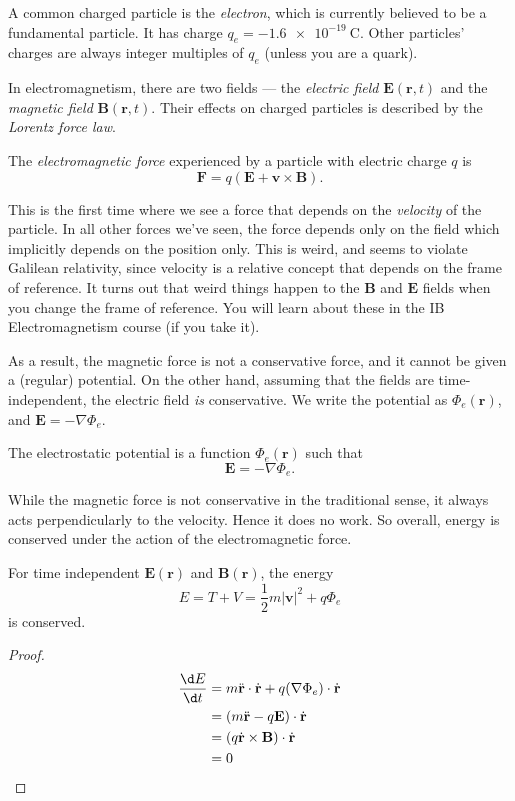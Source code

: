 \documentclass[a4paper]{article}
\begin{document}
A common charged particle is the \emph{electron}, which is currently believed to be a fundamental particle. It has charge $q_e = \SI{-1.6e-19}{\coulomb}$. Other particles' charges are always integer multiples of $q_e$ (unless you are a quark).

In electromagnetism, there are two fields --- the \emph{electric field} $\mathbf{E}(\mathbf{r}, t)$ and the \emph{magnetic field} $\mathbf{B}(\mathbf{r}, t)$. Their effects on charged particles is described by the \emph{Lorentz force law}.
\begin{law}
  The \emph{electromagnetic force} experienced by a particle with electric charge $q$ is
  \[
    \mathbf{F} = q(\mathbf{E} + \mathbf{v}\times \mathbf{B}).
  \]
\end{law}
This is the first time where we see a force that depends on the \emph{velocity} of the particle. In all other forces we've seen, the force depends only on the field which implicitly depends on the position only. This is weird, and seems to violate Galilean relativity, since velocity is a relative concept that depends on the frame of reference. It turns out that weird things happen to the $\mathbf{B}$ and $\mathbf{E}$ fields when you change the frame of reference. You will learn about these in the IB Electromagnetism course (if you take it).

As a result, the magnetic force is not a conservative force, and it cannot be given a (regular) potential. On the other hand, assuming that the fields are time-independent, the electric field \emph{is} conservative. We write the potential as $\Phi_e(\mathbf{r})$, and $\mathbf{E} = -\nabla \Phi_e$.

\begin{defi}
  The electrostatic potential is a function $\Phi_e(\mathbf{r})$ such that
  \[
    \mathbf{E} = -\nabla \Phi_e.
  \]
\end{defi}
While the magnetic force is not conservative in the traditional sense, it always acts perpendicularly to the velocity. Hence it does no work. So overall, energy is conserved under the action of the electromagnetic force.
\begin{prop}
  For time independent $\mathbf{E}(\mathbf{r})$ and $\mathbf{B}(\mathbf{r})$, the energy
  \[
    E = T + V = \frac{1}{2}m|\mathbf{v}|^2 + q\Phi_e
  \]
  is conserved.
\end{prop}

\begin{proof}
  \begin{align*}
    \frac{\d E}{\d t} &= m\ddot{\mathbf{r}}\cdot \dot{\mathbf{r}} + q(\nabla \Phi_e)\cdot \dot{\mathbf{r}}\\
    &= (m\ddot{\mathbf{r}} - q\mathbf{E}) \cdot \dot{\mathbf{r}}\\
    &= (q\dot{\mathbf{r}}\times \mathbf{B})\cdot \dot{\mathbf{r}}\\
    &= 0
  \end{align*}
\end{proof}
\end{document}
